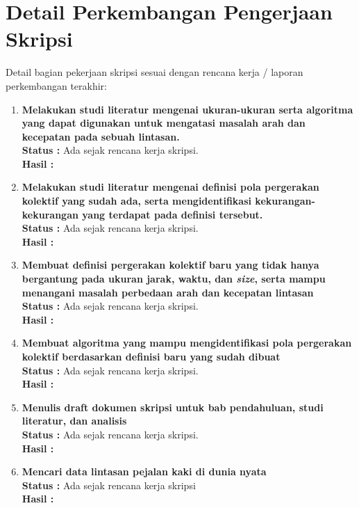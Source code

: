 \documentclass[a4paper,twoside]{article}
\begin{document}
\section{Detail Perkembangan Pengerjaan Skripsi}
Detail bagian pekerjaan skripsi sesuai dengan rencana kerja / laporan perkembangan terakhir:
	\begin{enumerate}
		\item \textbf{Melakukan studi literatur mengenai ukuran-ukuran serta algoritma yang dapat digunakan untuk mengatasi masalah arah dan kecepatan pada sebuah lintasan.} \\
		{\bf Status :} Ada sejak rencana kerja skripsi.\\
		{\bf Hasil :} \\
		
		\item \textbf{Melakukan studi literatur mengenai definisi pola pergerakan kolektif yang sudah ada, serta mengidentifikasi kekurangan-kekurangan yang terdapat pada definisi tersebut.}\\
		{\bf Status :} Ada sejak rencana kerja skripsi.\\
		{\bf Hasil :}

		\item \textbf{Membuat definisi pergerakan kolektif baru yang tidak hanya bergantung pada ukuran jarak, waktu, dan \textit{size}, serta mampu menangani masalah perbedaan arah dan kecepatan lintasan}\\
		{\bf Status :} Ada sejak rencana kerja skripsi.\\
		{\bf Hasil :}

		\item \textbf{Membuat algoritma yang mampu mengidentifikasi pola pergerakan kolektif berdasarkan definisi baru yang sudah dibuat}\\
		{\bf Status :} Ada sejak rencana kerja skripsi.\\
		{\bf Hasil :}

		\item \textbf{Menulis draft dokumen skripsi untuk bab pendahuluan, studi literatur, dan analisis}\\
		{\bf Status :} Ada sejak rencana kerja skripsi.\\
		{\bf Hasil :}

		\item \textbf{Mencari data lintasan pejalan kaki di dunia nyata}\\
		{\bf Status :} Ada sejak rencana kerja skripsi \\
		{\bf Hasil :} 


\end{enumerate}
\end{document}
